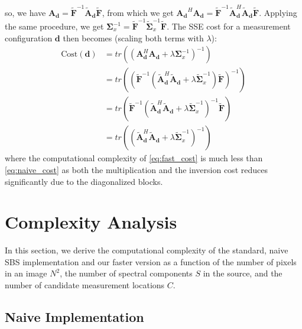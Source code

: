 \documentclass{article}
\begin{document}
so, we have $\bm{A_d} = \widetilde{\bm F}^{-1} \widetilde{\bm A}_{\bm d}
\widetilde{\bm F}$, from which we get $\bm{A_d}^H \bm{A_d} = \widetilde{\bm
F}^{-1} \widetilde{\bm A}_{\bm d}^H \widetilde{\bm A}_{\bm d} \widetilde{\bm
F}$. Applying the same procedure, we get $\bm \Sigma_x^{-1} =
\widetilde{\bm F}^{-1} \widetilde{\bm \Sigma}_x^{-1} \widetilde{\bm F}$.
The SSE cost for a measurement configuration $\bm d$ then becomes (scaling both terms
with $\lambda$):
\begin{align}
\text{Cost}(\bm{d}) & = tr\left(\left( {\bm A}_{\bm d}^H {\bm A}_{\bm d} +
\lambda \bm \Sigma_x^{-1} \right)^{-1} \right)
\label{eq:naive_cost}\\
& = tr\left(\left(\widetilde{\bm F}^{-1} \left( \widetilde{\bm A}_{\bm d}^H
\widetilde{\bm A}_{\bm d} + \lambda \widetilde{\bm \Sigma}_x^{-1} \right)
\widetilde{\bm F}\right)^{-1}\right) \nonumber \\
& = tr\left(\widetilde{\bm F}^{-1} \left( \widetilde{\bm A}_{\bm d}^H
\widetilde{\bm A}_{\bm d} + \lambda \widetilde{\bm \Sigma}_x^{-1} \right)^{-1}
\widetilde{\bm F}\right) \nonumber \\
& = tr\left(\left( \widetilde{\bm A}_{\bm d}^H \widetilde{\bm A}_{\bm d} +
\lambda \widetilde{\bm \Sigma}_x^{-1} \right)^{-1} \right)
\label{eq:fast_cost}
\end{align}
where the computational complexity of \eqref{eq:fast_cost} is much less than
\eqref{eq:naive_cost} as both the multiplication and the inversion cost reduces
significantly due to the diagonalized blocks.

\section{Complexity Analysis}

In this section, we derive the computational complexity of the standard, naive
SBS implementation and our faster version as a function of the number of pixels
in an image $N^2$, the number of spectral components $S$ in the source, and the
number of candidate measurement locations $C$.

\subsection{Naive Implementation}
\end{document}

